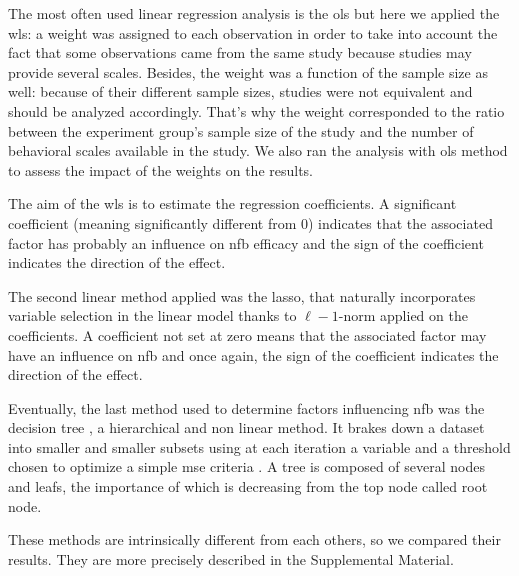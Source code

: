 The most often used linear regression analysis is the \gls{ols} but here we applied the \gls{wls}: a 
weight was assigned to each observation in order to take into account the fact that some observations came from the same study because studies 
may provide several scales. Besides, the weight was a function of the sample size as well: because of their different sample sizes,
studies were not equivalent and should be analyzed accordingly. That's why the weight corresponded to the ratio between the experiment group's sample size of the study and 
the number of behavioral scales available in the study. We also ran the analysis with \gls{ols} method to assess the impact of the weights on the results. 

The aim of the \gls{wls} is to estimate the regression coefficients. A significant coefficient (meaning significantly different from 0) indicates 
that the associated factor has probably an influence on \gls{nfb} efficacy and the sign of the coefficient indicates the direction of the effect.

The second linear method applied was the \gls{lasso}, that naturally incorporates variable selection 
in the linear model thanks to $\ell-1$-norm applied on the coefficients. A coefficient not set at zero means that 
the associated factor may have an influence on \gls{nfb} and once again, the sign of the coefficient indicates the direction of the effect.

Eventually, the last method used to determine factors influencing \gls{nfb} was the decision tree \citep{Quinlan1986}, a hierarchical and non linear method.
It brakes down a dataset into smaller and smaller subsets using at each iteration a variable and a threshold chosen to optimize a simple \gls{mse} 
criteria \citep{James2013}. A tree is composed of several nodes and leafs, the importance of which is decreasing from the top node called root node. 

These methods are intrinsically different from each others, so we compared their results. They are more precisely described in the Supplemental Material.
















